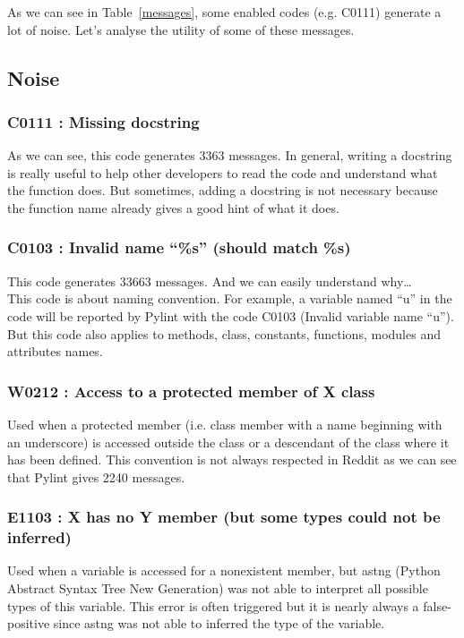 \documentclass[12pt, a4paper]{article}
\newcommand{\pyl}{\textsf{Pylint}}
\begin{document}
As we can see in Table~\ref{messages}, some enabled codes (e.g. C0111) generate a lot of noise. 
Let's analyse the utility of some of these messages.
\bigskip
\subsection*{Noise}
\subsubsection*{C0111 : Missing docstring}

As we can see, this code generates 3363 messages.
In general, writing a docstring is really useful to help other developers to read the code and understand what the function does.
But sometimes, adding a docstring is not necessary because the function name already gives a good hint of what it does.


\medskip
\subsubsection*{C0103 : Invalid name ``\%s''  (should match \%s)}

This code generates 33663 messages.
And we can easily understand why\dots \\
This code is about naming convention.
For example, a variable named ``u'' in the code will be reported by \pyl{} with the code C0103 (Invalid variable name ``u'').
But this code also applies to methods, class, constants, functions, modules and attributes names.

\subsubsection*{W0212 : Access to a protected member of X class}

Used when a protected member (i.e. class member with a name beginning with an underscore) is accessed outside the class or a descendant of the class where it has been defined.
This convention is not always respected in Reddit as we can see that \pyl{} gives 2240 messages.


\medskip
\subsubsection*{E1103 : X has no Y member (but some types could not be inferred)}

Used when a variable is accessed for a nonexistent member, but astng (Python Abstract Syntax Tree New Generation) was not able to interpret all possible types of this variable.
This error is often triggered but it is nearly always a false-positive since astng was not able to inferred the type of the variable.
\end{document}
